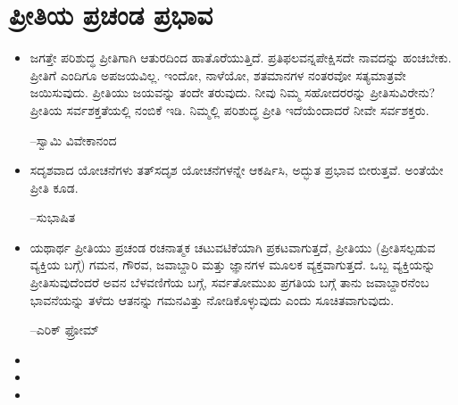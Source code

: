 
\chapter{ಪ್ರೀತಿಯ ಪ್ರಚಂಡ ಪ್ರಭಾವ}

\begin{itemize}
\item ಜಗತ್ತೇ ಪರಿಶುದ್ಧ ಪ್ರೀತಿಗಾಗಿ ಆತುರದಿಂದ ಹಾತೊರೆಯುತ್ತಿದೆ. ಪ್ರತಿಫಲವನ್ನಪೇಕ್ಷಿಸದೇ ನಾವದನ್ನು ಹಂಚಬೇಕು. ಪ್ರೀತಿಗೆ ಎಂದಿಗೂ ಅಪಜಯವಿಲ್ಲ. ಇಂದೋ, ನಾಳೆಯೋ, ಶತಮಾನಗಳ ನಂತರವೋ ಸತ್ಯಮಾತ್ರವೇ ಜಯಿಸುವುದು. ಪ್ರೀತಿಯು ಜಯವನ್ನು ತಂದೇ ತರುವುದು. ನೀವು ನಿಮ್ಮ ಸಹೋದರರನ್ನು ಪ್ರೀತಿಸುವಿರೇನು? ಪ್ರೀತಿಯ ಸರ್ವಶಕ್ತತೆಯಲ್ಲಿ ನಂಬಿಕೆ ಇಡಿ. ನಿಮ್ಮಲ್ಲಿ ಪರಿಶುದ್ಧ ಪ್ರೀತಿ ಇದೆಯೆಂದಾದರೆ ನೀವೇ ಸರ್ವಶಕ್ತರು.\\
\begin{flushright}
–ಸ್ವಾಮಿ ವಿವೇಕಾನಂದ
\end{flushright}

 \item ಸದೃಶವಾದ ಯೋಚನೆಗಳು ತತ್​ಸದೃಶ ಯೋಚನೆಗಳನ್ನೇ ಆಕರ್ಷಿಸಿ, ಅದ್ಭುತ ಪ್ರಭಾವ ಬೀರುತ್ತವೆ. ಅಂತೆಯೇ ಪ್ರೀತಿ ಕೂಡ.\\
\begin{flushright}
–ಸುಭಾಷಿತ
\end{flushright}

 \item ಯಥಾರ್ಥ ಪ್ರೀತಿಯು ಪ್ರಚಂಡ ರಚನಾತ್ಮಕ ಚಟುವಟಿಕೆಯಾಗಿ ಪ್ರಕಟವಾಗುತ್ತದೆ, ಪ್ರೀತಿಯು (ಪ್ರೀತಿಸಲ್ಪಡುವ ವ್ಯಕ್ತಿಯ ಬಗ್ಗೆ) ಗಮನ, ಗೌರವ, ಜವಾಬ್ದಾರಿ ಮತ್ತು ಜ್ಞಾನಗಳ ಮೂಲಕ ವ್ಯಕ್ತವಾಗುತ್ತದೆ. ಒಬ್ಬ ವ್ಯಕ್ತಿಯನ್ನು ಪ್ರೀತಿಸುವುದೆಂದರೆ ಅವನ ಬೆಳವಣಿಗೆಯ ಬಗ್ಗೆ, ಸರ್ವತೋಮುಖ ಪ್ರಗತಿಯ ಬಗ್ಗೆ ತಾನು ಜವಾಬ್ದಾರನೆಂಬ ಭಾವನೆಯನ್ನು ತಳೆದು ಆತನನ್ನು ಗಮನವಿತ್ತು ನೋಡಿಕೊಳ್ಳುವುದು ಎಂದು ಸೂಚಿತವಾಗುವುದು.\\
\begin{flushright}
–ಎರಿಕ್ ಫ್ರೋಮ್​
\end{flushright}

 \item {}

 \item {}

 \item {}


\end{itemize}
